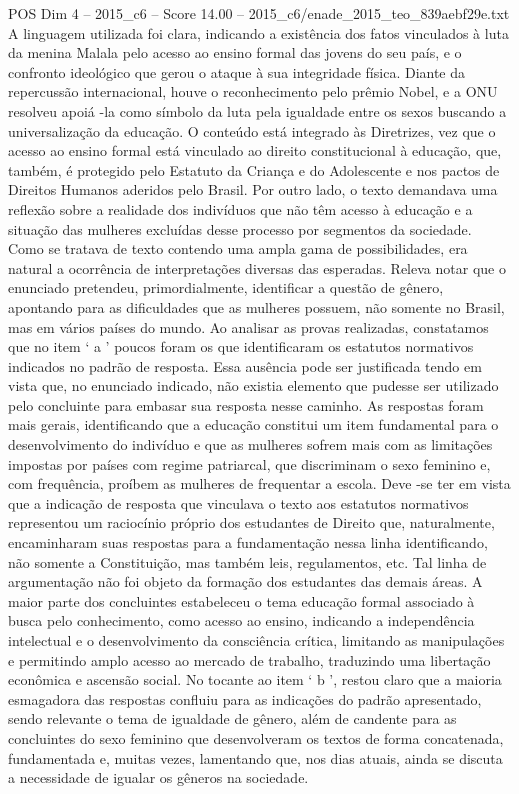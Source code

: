 \begin{textsample}{POS Dim 4 – 2015\_c6 – Score 14.00 – 2015\_c6/enade\_2015\_teo\_839aebf29e.txt}
A linguagem utilizada foi clara, indicando a existência dos fatos vinculados à luta da menina Malala pelo acesso ao ensino formal das jovens do seu país, e o confronto ideológico que gerou o ataque à sua integridade física.
Diante da repercussão internacional, houve o reconhecimento pelo prêmio Nobel, e a ONU resolveu apoiá -la como símbolo da luta pela igualdade entre os sexos buscando a universalização da educação.
O conteúdo está integrado às Diretrizes, vez que o acesso ao ensino formal está vinculado ao direito constitucional à educação, que, também, é protegido pelo Estatuto da Criança e do Adolescente e nos pactos de Direitos Humanos aderidos pelo Brasil.
Por outro lado, o texto demandava uma reflexão sobre a realidade dos indivíduos que não têm acesso à educação e a situação das mulheres excluídas desse processo por segmentos da sociedade.
Como se tratava de texto contendo uma ampla gama de possibilidades, era natural a ocorrência de interpretações diversas das esperadas.
Releva notar que o enunciado pretendeu, primordialmente, identificar a questão de gênero, apontando para as dificuldades que as mulheres possuem, não somente no Brasil, mas em vários países do mundo.
Ao analisar as provas realizadas, constatamos que no item ‘ a ’ poucos foram os que identificaram os estatutos normativos indicados no padrão de resposta.
Essa ausência pode ser justificada tendo em vista que, no enunciado indicado, não existia elemento que pudesse ser utilizado pelo concluinte para embasar sua resposta nesse caminho.
As respostas foram mais gerais, identificando que a educação constitui um item fundamental para o desenvolvimento do indivíduo e que as mulheres sofrem mais com as limitações impostas por países com regime patriarcal, que discriminam o sexo feminino e, com frequência, proíbem as mulheres de frequentar a escola.
Deve -se ter em vista que a indicação de resposta que vinculava o texto aos estatutos normativos representou um raciocínio próprio dos estudantes de Direito que, naturalmente, encaminharam suas respostas para a fundamentação nessa linha identificando, não somente a Constituição, mas também leis, regulamentos, etc.
Tal linha de argumentação não foi objeto da formação dos estudantes das demais áreas.
A maior parte dos concluintes estabeleceu o tema educação formal associado à busca pelo conhecimento, como acesso ao ensino, indicando a independência intelectual e o desenvolvimento da consciência crítica, limitando as manipulações e permitindo amplo acesso ao mercado de trabalho, traduzindo uma libertação econômica e ascensão social.
No tocante ao item ‘ b ’, restou claro que a maioria esmagadora das respostas confluiu para as indicações do padrão apresentado, sendo relevante o tema de igualdade de gênero, além de candente para as concluintes do sexo feminino que desenvolveram os textos de forma concatenada, fundamentada e, muitas vezes, lamentando que, nos dias atuais, ainda se discuta a necessidade de igualar os gêneros na sociedade.

\end{textsample}

